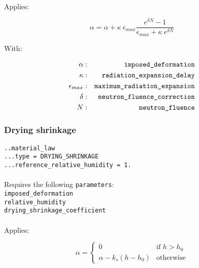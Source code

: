 \documentclass[10pt]{article}
\begin{document}
\paragraph{}Applies:

\begin{equation}
	\alpha = \alpha + \kappa\ \epsilon_{max} \frac{e^{\delta N}-1}{\epsilon_{max}+\kappa\ e^{\delta N}}
\end{equation}

With:

\begin{eqnarray}
	\alpha & : & \verb+imposed_deformation+ \notag \\
	\kappa & : & \verb+radiation_expansion_delay+\notag  \\
	\epsilon_{max} & : & \verb+maximum_radiation_expansion+ \notag \\
	\delta & : & \verb+neutron_fluence_correction+ \notag \\
	N & : & \verb+neutron_fluence+ \notag 
\end{eqnarray}

\subsubsection{Drying shrinkage}

\noindent \verb+..material_law+\\
\verb+...type = DRYING_SHRINKAGE+\\
\verb+...reference_relative_humidity = 1.+

\paragraph{}Requires the following \verb+parameters+:\\

\noindent \verb+imposed_deformation+\\
\verb+relative_humidity+\\
\verb+drying_shrinkage_coefficient+

\paragraph{}Applies:

\begin{equation}
	\alpha = \left\{ \begin{array}{cl} 0 & \text{if } h > h_0 \\ \alpha - k_s ( h - h_0 ) & \text{otherwise} \end{array} \right.
\end{equation}
\end{document}
